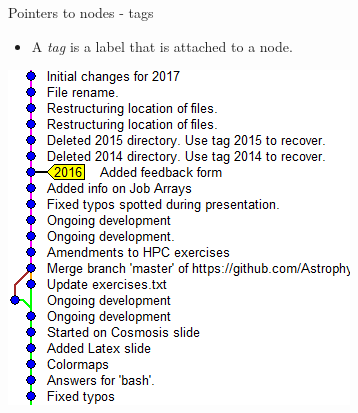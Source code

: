 \documentclass[usenames,dvipsnames]{beamer}
\begin{document}
\begin{frame}{Pointers to nodes - tags}
  \begin{block}{}
    \begin{itemize}
      \item{A \textit{tag} is a label that is attached to a node.}
    \end{itemize}
  \end{block}
  \begin{block}{}
    \begin{center}
      \includegraphics[scale=0.6]{Tag.png}
    \end{center}
  \end{block}
\end{frame}
  
\end{document}
